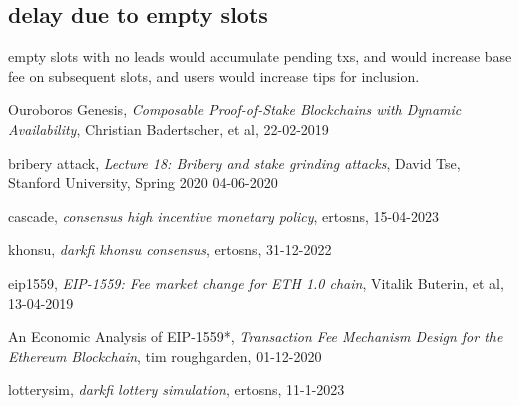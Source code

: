 \documentclass{article}
\begin{document}
\subsection{ delay due to empty slots}
 empty slots with no leads would accumulate pending txs, and would increase base fee on subsequent slots, and users would increase tips for inclusion.



\begin{thebibliography}{999}

  Ouroboros Genesis,
  \emph{Composable Proof-of-Stake Blockchains with Dynamic Availability},
  Christian Badertscher, et al,
  22-02-2019

  bribery attack,
  \emph{Lecture 18: Bribery and stake grinding attacks},
  David Tse,
  Stanford University, Spring 2020
  04-06-2020

  cascade,
  \emph{consensus high incentive monetary policy},
  ertosns,
  15-04-2023

  khonsu,
  \emph{darkfi khonsu consensus},
  ertosns,
  31-12-2022

  eip1559,
  \emph{EIP-1559: Fee market change for ETH 1.0 chain},
  Vitalik Buterin, et al,
  13-04-2019

  An Economic Analysis of EIP-1559*,
  \emph{Transaction Fee Mechanism Design for the Ethereum Blockchain},
  tim roughgarden,
  01-12-2020

  lotterysim,
  \emph{darkfi lottery simulation},
  ertosns,
  11-1-2023
\end{thebibliography}
\end{document}
